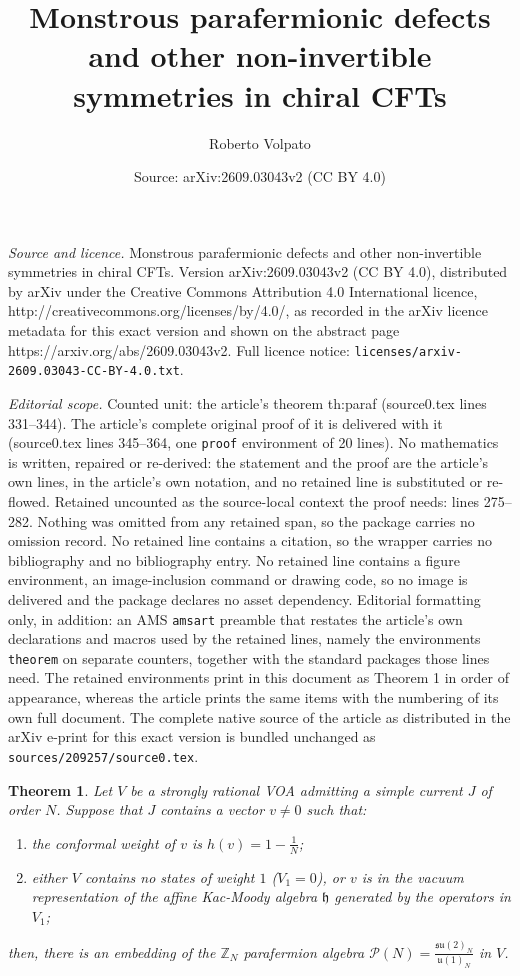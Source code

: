 \documentclass[10pt,a4paper]{amsart}
\title{Monstrous parafermionic defects and other non-invertible symmetries in chiral CFTs}
\author{Roberto Volpato}
\date{Source: arXiv:2609.03043v2 (CC BY 4.0)}
\newtheorem{theorem}{Theorem}
\newcommand{\ZZ}{\mathbb{Z}}
\newcommand{\alg}[1]{\mathfrak{#1}}
\newcommand{\paraf}{\mathcal{P}}
\begin{document}
\maketitle

\noindent\emph{Source and licence.} Monstrous parafermionic defects and other non-invertible symmetries in chiral CFTs. Version arXiv:2609.03043v2 (CC BY 4.0), distributed by arXiv under the Creative Commons Attribution 4.0 International licence, http://creativecommons.org/licenses/by/4.0/, as recorded in the arXiv licence metadata for this exact version and shown on the abstract page https://arxiv.org/abs/2609.03043v2. Full licence notice: \texttt{licenses/arxiv-2609.03043-CC-BY-4.0.txt}.\par\smallskip

\noindent\textit{Editorial scope.} Counted unit: the article's theorem th:paraf (source0.tex lines 331--344). The article's complete original proof of it is delivered with it (source0.tex lines 345--364, one \texttt{proof} environment of 20 lines). No mathematics is written, repaired or re-derived: the statement and the proof are the article's own lines, in the article's own notation, and no retained line is substituted or re-flowed.  Retained uncounted as the source-local context the proof needs: lines 275--282.  Nothing was omitted from any retained span, so the package carries no omission record.  No retained line contains a citation, so the wrapper carries no bibliography and no bibliography entry.  No retained line contains a figure environment, an image-inclusion command or drawing code, so no image is delivered and the package declares no asset dependency.  Editorial formatting only, in addition: an AMS \texttt{amsart} preamble that restates the article's own declarations and macros used by the retained lines, namely the environments \texttt{theorem} on separate counters, together with the standard packages those lines need.  The retained environments print in this document as Theorem 1 in order of appearance, whereas the article prints the same items with the numbering of its own full document.  The complete native source of the article as distributed in the arXiv e-print for this exact version is bundled unchanged as \texttt{sources/209257/source0.tex}.
\begin{theorem}\label{th:simplecurrent}
	Let $V$ be a strongly rational VOA admitting a simple current $J$ of order $N$.  Suppose that $J$ contains a vector $v\neq 0$ such that:
	\begin{enumerate}
		\item the conformal weight of $v$ is $h(v)=1-\frac{1}{N}$;
		\item either $V$ contains no states of weight $1$ ($V_1=0$), or $v$ is in the vacuum representation of the affine Kac-Moody algebra $\alg{h}$ generated by the operators in $V_1$;
	\end{enumerate}
then, there is an embedding of the $\ZZ_N$ parafermion algebra $\paraf(N)=\frac{\alg{su}(2)_N}{\alg{u}(1)_N}$ in $V$.
\end{theorem}
\end{document}
